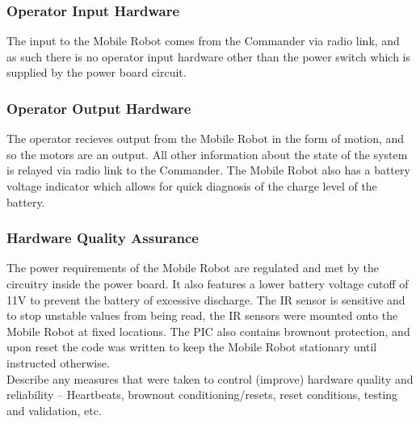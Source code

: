 \documentclass[11pt,a4paper]{article}
\begin{document}
    \subsubsection{Operator Input Hardware}
      The input to the Mobile Robot comes from the Commander via radio link, and as such there is no operator input hardware other than the power switch which is supplied by the power board circuit.
    \subsubsection{Operator Output Hardware}
      The operator recieves output from the Mobile Robot in the form of motion, and so the motors are an output. All other information about the state of the system is relayed via radio link to the Commander. The Mobile Robot also has a battery voltage indicator which allows for quick diagnosis of the charge level of the battery.
    \subsubsection{Hardware Quality Assurance}
      The power requirements of the Mobile Robot are regulated and met by the circuitry inside the power board. It also features a lower battery voltage cutoff of 11V to prevent the battery of excessive discharge. The IR sensor is sensitive and to stop unstable values from being read, the IR sensors were mounted onto the Mobile Robot at fixed locations. The PIC also contains brownout protection, and upon reset the code was written to keep the Mobile Robot stationary until instructed otherwise.\\

    Describe any measures that were taken to control (improve) hardware quality and reliability – Heartbeats, brownout conditioning/resets, reset conditions, testing and validation, etc.
\end{document}
